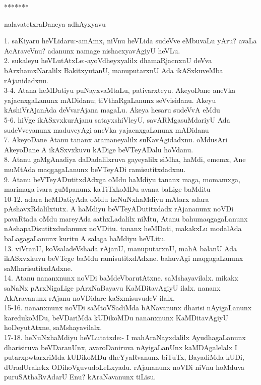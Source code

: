 \documentclass{article}
\begin{document}
\begin{center}
*******
\end{center}

\begin{center}
nalavatetxraDaneya adhAyxyavu
\end{center}

1. saKiyaru heVLidaru:-amAmx, niVnu heVLida sudeVve eMbuvaLu yAru? avaLa AcAraveVnu? adanunx namage nishacxyavAgiyU heVLu.\\
2. sukaleyu heVLutAtxLe:-ayoVdheyxyalilx dhamaRjacnxnU deVva bArxhamxNaralilx BakitxyutanU, manuputarxnU Ada ikASxkuveMba rAjanidadxnu.\\
3-4. Atana heMDatiyu puNayxvaMtaLu, pativarxteyu. AkeyoDane aneVka yajacnxgaLanunx mADidanu; tiVthaRgaLanunx seVvisidanu. Akeyu kAshiVrAjanAda deVvarAjana magaLu. Akeya hesaru sudeVvA eMdu\\
5-6. hiVge ikASxvxkurAjanu satayxshiVleyU, savARMgasuMdariyU Ada sudeVveyanunx maduveyAgi aneVka yajacnxgaLanunx mADidanu\\
7. AkeyoDane Atanu tananx aramaneyalilx suKavAgidadxnu. oMdusAri AkeyoDane A ikASxvxkuvu kADige beVTeyADalu hoVdanu.\\
8. Atanu gaMgAnadiya daDadalilxruva gayeyalilx siMha, haMdi, ememx, Ane muMtAda maqgagaLanunx beVTeyADi ramisutitxdadxnu.\\
9. Atanu beVTeyADutitxdAdxga oMdu haMdiyu tananx maga, momamxga, marimaga ivara guMpanunx kaTiTxkoMDu avana baLige baMditu\\
10-12. adara heMDatiyAda oMdu heNuNxhaMdiyu mAtarx adara pAshavxRdalilxtutx. A haMdiyu beVTeyADutitxdadx rAjananunx noVDi pavaRtada oMdu mareyAda sathxLadalilx niMtu, Atanu bahumaqgagaLanunx nAshapaDisutitxdudanunx noVDitu. tananx heMDati, makakxLu modalAda baLagagaLanunx kuritu A salaga haMdiyu heVLitu.\\
13. viVranU, koVsaladeVshada rAjanU, manuputarxnU, mahA balanU Ada ikASxvxkuvu beVTege baMdu ramisutitxdAdxne. bahuvAgi maqgagaLanunx saMharisutitxdAdxne.\\
14. Atanu nananxnunx noVDi baMdeVbarutAtxne. saMshayavilalx. mikakx saNaNx pArxNigaLige pArxNaBayavu KaMDitavAgiyU ilalx. nananx AkAravanunx rAjanu noVDidare kaSxmisuvudeV ilalx.\\
15-16. nananxnunx noVDi saMtoVSadiMda bANavanunx dharisi nAyigaLanunx karedukoMDu, beVDariMda kUDikoMDu nananxnunx KaMDitavAgiyU hoDeyutAtxne, saMshayavilalx.\\
17-18. heNuNxhaMdiyu heVLutatxde:- I mahAraNayxdalilx AyudhagaLanunx dharisiruva beVDaranUnx, avaroDaniruva nAyigaLanUnx kaMDAgalelalx I putarxpwtarxriMda kUDikoMDu dheYyaRvanunx biTuTx, BayadiMda kUDi, dUradUrakekx ODihoVguvudoLeLxyadu. rAjananunx noVDi niVnu hoMduva puruSAthaRvAdarU Enu? kAraNavanunx tiLisu.\\
\end{document}
